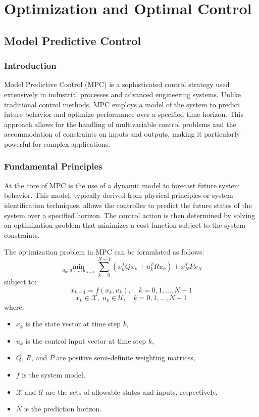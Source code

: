 	\appendix
	\chapter{Optimization and Optimal Control}
	\label{app:optimalControl}
	
	\section{Model Predictive Control}
\subsection*{Introduction}
Model Predictive Control (MPC) is a sophisticated control strategy used extensively in industrial processes and advanced engineering systems. Unlike traditional control methods, MPC employs a model of the system to predict future behavior and optimize performance over a specified time horizon. This approach allows for the handling of multivariable control problems and the accommodation of constraints on inputs and outputs, making it particularly powerful for complex applications.



\subsection*{Fundamental Principles}
At the core of MPC is the use of a dynamic model to forecast future system behavior. This model, typically derived from physical principles or system identification techniques, allows the controller to predict the future states of the system over a specified horizon. The control action is then determined by solving an optimization problem that minimizes a cost function subject to the system constraints.

The optimization problem in MPC can be formulated as follows:
\[
\min_{u_{0}, u_{1}, \ldots, u_{N-1}} \sum_{k=0}^{N-1} \left( x_k^T Q x_k + u_k^T R u_k \right) + x_N^T P x_N
\]
subject to:
\[
x_{k+1} = f(x_k, u_k), \quad k = 0, 1, \ldots, N-1
\]
\[
x_k \in \mathcal{X}, \; u_k \in \mathcal{U}, \quad k = 0, 1, \ldots, N-1
\]
where:
\begin{itemize}
	\item \(x_k\) is the state vector at time step \(k\),
	\item \(u_k\) is the control input vector at time step \(k\),
	\item \(Q\), \(R\), and \(P\) are positive semi-definite weighting matrices,
	\item \(f\) is the system model,
	\item \(\mathcal{X}\) and \(\mathcal{U}\) are the sets of allowable states and inputs, respectively,
	\item \(N\) is the prediction horizon.
\end{itemize}

